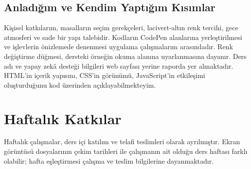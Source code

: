 \documentclass[12pt,a4paper]{article}
\begin{document}
\subsection{Anladığım ve Kendim Yaptığım Kısımlar}
Kişisel katkılarım, masalların seçim gerekçeleri, lacivert-altın renk tercihi, gece atmosferi ve sade bir yapı talebidir. Kodların CodePen alanlarına yerleştirilmesi ve işlevlerin önizlemede denenmesi uygulama çalışmalarım arasındadır. Renk değiştirme düğmesi, dersteki örneğin okuma alanına uyarlanmasına dayanır. Ders adı ve yapay zekâ desteği bilgileri web sayfası yerine raporda yer almaktadır. HTML'in içerik yapısını, CSS'in görünümü, JavaScript'in etkileşimi oluşturduğunu kod üzerinden açıklayabilmekteyim.

\section{Haftalık Katkılar}
Haftalık çalışmalar, ders içi katılım ve telafi teslimleri olarak ayrılmıştır. Ekran görüntüsü dosyalarının çekim tarihleri ile çalışmanın ait olduğu ders haftası farklı olabilir; hafta eşleştirmesi çalışma ve teslim bilgilerine dayanmaktadır.

\end{document}
